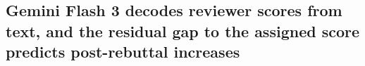 \documentclass{article}
\begin{document}
\subsection{Gemini Flash 3 decodes reviewer scores from text, and the residual gap to the assigned score predicts post-rebuttal increases}\label{res:instrument}
%
%
%
%
\end{document}
